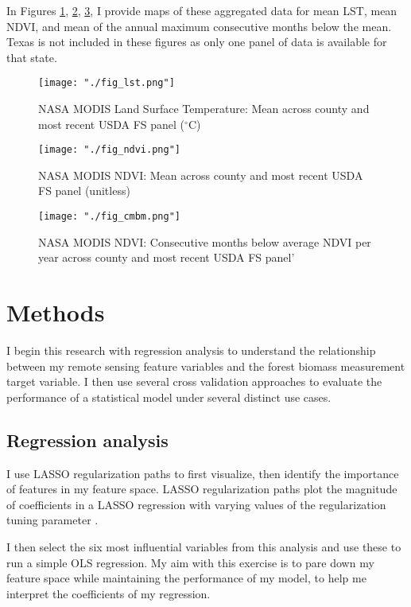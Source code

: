 \documentclass{article}
\begin{document}
In Figures \ref{fig:lst}, \ref{fig:ndvi}, \ref{fig:cmbm}, I provide maps of these aggregated data for mean LST, mean NDVI, and mean of the annual maximum consecutive months below the mean. Texas is not included in these figures as only one panel of data is available for that state. 

\begin{figure}[!htbp]
  \centering
  \texttt{[image: "./fig\_lst.png"]}
  \caption{\label{fig:lst} NASA MODIS Land Surface Temperature: Mean across county and most recent USDA FS panel ($^\circ$C)}
\end{figure}

\begin{figure}[!htbp]
  \centering
  \texttt{[image: "./fig\_ndvi.png"]}
  \caption{\label{fig:ndvi} NASA MODIS NDVI: Mean across county and most recent USDA FS panel (unitless)}
\end{figure}

\begin{figure}[!htbp]
  \centering
  \texttt{[image: "./fig\_cmbm.png"]}
  \caption{\label{fig:cmbm} NASA MODIS NDVI: Consecutive months below average NDVI per year across county and most recent USDA FS panel'}
\end{figure}

\section{Methods}
\label{sec:methods}

I begin this research with regression analysis to understand the relationship between my remote sensing feature variables and the forest biomass measurement target variable. I then use several cross validation approaches to evaluate the performance of a statistical model under several distinct use cases.

\subsection{Regression analysis}
I use LASSO regularization paths to first visualize, then identify the importance of features in my feature space. LASSO regularization paths plot the magnitude of coefficients in a LASSO regression with varying values of the regularization tuning parameter \cite{hastietibs}. 

I then select the six most influential variables from this analysis and use these to run a simple OLS regression. My aim with this exercise is to pare down my feature space while maintaining the performance of my model, to help me interpret the coefficients of my regression.
\end{document}
